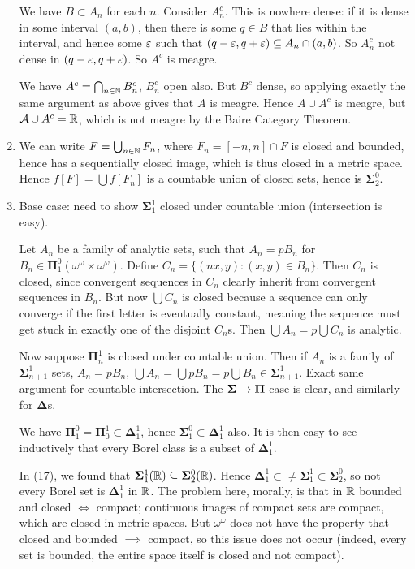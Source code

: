 \documentclass[]{article}
\newcommand{\om}{\omega}
\newcommand{\bosig}{\bm{\Sigma}}
\newcommand{\bopi}{\bm{\Pi}}
\newcommand{\bodel}{\bm{\Delta}}
\begin{document}
\begin{enumerate}[label = (\arabic*)]
    We have $B \subset A_n$ for each $n$. Consider $A_n^c$. This is nowhere dense: if it is dense in some interval $(a,b)$, then there is some $q \in B$ that lies within the interval, and hence some $\varepsilon$ such that $(q-\varepsilon,q+\varepsilon) \subseteq A_n \cap (a,b)$. So $A_n^c$ not dense in $(q-\varepsilon,q+\varepsilon)$. So $A^c$ is meagre.

    We have $A^c = \bigcap_{n\in\mathbb{N}}B_n^c$, $B_n^c$ open also. But $B^c$ dense, so applying exactly the same argument as above gives that $A$ is meagre. Hence $A \cup A^c$ is meagre, but $\mathcal{A} \cup A^c = \mathbb{R}$, which is not meagre by the Baire Category Theorem.

    \item We can write $F = \bigcup_{n\in\mathbb{N}}F_n$, where $F_n = [-n,n] \cap F$ is closed and bounded, hence has a sequentially closed image, which is thus closed in a metric space. Hence $f[F] = \bigcup f[F_n]$ is a countable union of closed sets, hence is $\bosig^0_2$.
    
    \item Base case: need to show $\bosig^1_1$ closed under countable union (intersection is easy).
    
    Let $A_n$ be a family of analytic sets, such that $A_n = pB_n$ for $B_n \in \bopi^0_1(\om^\om\times\om^\om)$. Define $C_n = \{(nx,y):(x,y) \in B_n\}$. Then $C_n$ is closed, since convergent sequences in $C_n$ clearly inherit from convergent sequences in $B_n$. But now $\bigcup C_n$ is closed because a sequence can only converge if the first letter is eventually constant, meaning the sequence must get stuck in exactly one of the disjoint $C_n$s. Then $\bigcup A_n = p\bigcup C_n$ is analytic.

    Now suppose $\bopi^1_n$ is closed under countable union. Then if $A_n$ is a family of $\bosig^1_{n+1}$ sets, $A_n = pB_n$, $\bigcup A_n = \bigcup pB_n = p\bigcup B_n \in \bosig^1_{n+1}$. Exact same argument for countable intersection. The $\bosig \ra \bopi$ case is clear, and similarly for $\bodel$s.

    We have $\bopi^0_1 = \bopi^1_0 \subset \bodel^1_1$, hence $\bosig^0_1 \subset \bodel^1_1$ also. It is then easy to see inductively that every Borel class is a subset of $\bodel^1_1$.

    In (17), we found that $\bosig^1_1(\R) \subset \bosig^0_2(\R)$. Hence $\bodel^1_1 \subset\neq \bosig^1_1 \subset \bosig^0_2$, so not every Borel set is $\bodel^1_1$ in $\mathbb{R}$. The problem here, morally, is that in $\mathbb{R}$ bounded and closed $\iff$ compact; continuous images of compact sets are compact, which are closed in metric spaces. But $\om^\om$ does not have the property that closed and bounded $\implies$ compact, so this issue does not occur (indeed, every set is bounded, the entire space itself is closed and not compact).


\end{enumerate}
\end{document}
